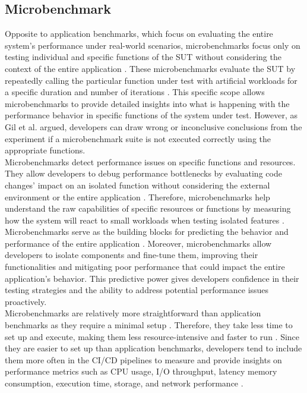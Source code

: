 \subsection{Microbenchmark}
\label{sec:microbenchmark}
Opposite to application benchmarks, which focus on evaluating the entire system's performance under real-world scenarios, microbenchmarks focus only on testing individual and specific functions of the \ac{SUT} without considering the context of the entire application \cite{gil2011microbenchmarkleasonslearned, laaber2019continuous}. These microbenchmarks evaluate the \ac{SUT} by repeatedly calling the particular function under test with artificial workloads for a specific duration and number of iterations \cite{japke2023earlymicrobenchmarkcatches, grambow, laaber2019softwaremicrobenchmarkinginthecloud, bermbach2017benchfoundry}. This specific scope allows microbenchmarks to provide detailed insights into what is happening with the performance behavior in specific functions of the system under test. However, as Gil et al. \cite{gil2011microbenchmarkleasonslearned} argued, developers can draw wrong or inconclusive conclusions from the experiment if a microbenchmark suite is not executed correctly using the appropriate functions.  \\
Microbenchmarks detect performance issues on specific functions and resources. They allow developers to debug performance bottlenecks by evaluating code changes' impact on an isolated function without considering the external environment or the entire application \cite{scheuner2018estimatingCloudApplication, seltzer1999thecaseforapplicationspecific}. Therefore, microbenchmarks help understand the raw capabilities of specific resources or functions by measuring how the system will react to small workloads when testing isolated features \cite{bermbach2017benchfoundry, gil2011microbenchmarkleasonslearned}. \\
Microbenchmarks serve as the building blocks for predicting the behavior and performance of the entire application \cite{grambow}. Moreover, microbenchmarks allow developers to isolate components and fine-tune them, improving their functionalities and mitigating poor performance that could impact the entire application’s behavior. This predictive power gives developers confidence in their testing strategies and the ability to address potential performance issues \cite{scheuner2018estimatingCloudApplication, grambow2021usingApplication} proactively.\\
Microbenchmarks are relatively more straightforward than application benchmarks as they require a minimal setup \cite{japke2023earlymicrobenchmarkcatches}. Therefore, they take less time to set up and execute, making them less resource-intensive and faster to run \cite{grambow}. Since they are easier to set up than application benchmarks, developers tend to include them more often in the \ac{CI}/\ac{CD} pipelines to measure and provide insights on performance metrics such as \ac{CPU} usage, I/O throughput, latency memory consumption, execution time, storage, and network performance \cite{scheuner2018cloudBenchmarkingSuit, laaber2024evaluatingSeachbasedsoftware, grambow2021usingApplication, scheuner2018estimatingCloudApplication, laaber2021applyingtcp, sun2022dissecting}. \\
